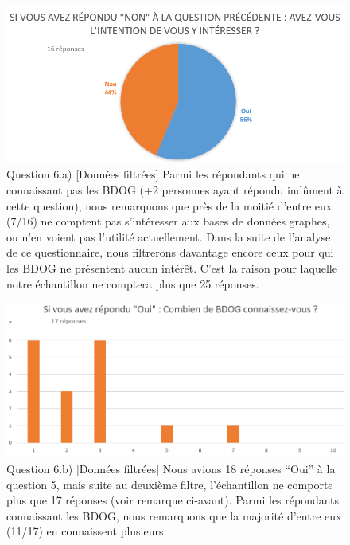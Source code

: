 \documentclass[a4paper,fleqn,12pt,oneside]{report}
\begin{document}
\begin{figure}[!ht]
\centering
\includegraphics[scale=0.8]{figures/QIntFilt.png}
\caption{Question 6.a) [Données filtrées] Parmi les répondants qui ne connaissant pas les BDOG (+2 personnes ayant  répondu indûment à cette question), nous remarquons que près de la moitié d'entre eux (7/16) ne comptent pas s'intéresser aux bases de données graphes, ou n'en voient pas l'utilité actuellement. Dans la suite de l'analyse de ce questionnaire, nous filtrerons davantage encore ceux pour qui les BDOG ne présentent aucun intérêt. C'est la raison pour laquelle notre échantillon ne comptera plus que 25 réponses.}
\label{fig:QIntFilt}
\end{figure}

\newpage
{}

\begin{figure}[!ht]
\centering
\includegraphics[scale=0.8]{figures/QNbFilt.png}
\caption{Question 6.b) [Données filtrées] Nous avions 18 réponses \enquote{Oui} à la question 5, mais suite au deuxième filtre, l'échantillon ne comporte plus que 17 réponses (voir remarque ci-avant). Parmi les répondants connaissant les BDOG, nous remarquons que la majorité d'entre eux (11/17) en connaissent plusieurs.}
\label{fig:QNbFilt}
\end{figure}
\end{document}
